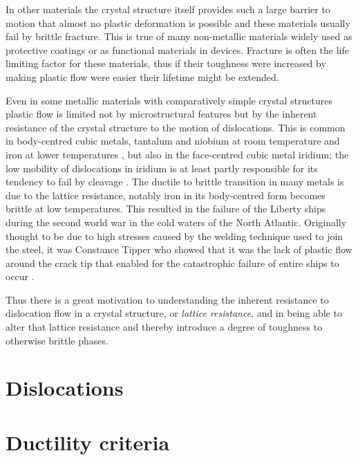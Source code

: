 In other materials the crystal structure itself provides such a large barrier to motion that almost no plastic deformation is possible and these materials usually fail by brittle fracture. This is true of many non-metallic materials widely used as protective coatings or as functional materials in devices. Fracture is often the life limiting factor for these materials, thus if their toughness were increased by making plastic flow were easier their lifetime might be extended. 

Even in some metallic materials with comparatively simple crystal structures plastic flow is limited not by microstructural features but by the inherent resistance of the crystal structure to the motion of dislocations. This is common in body-centred cubic metals, tantalum and niobium at room temperature and iron at lower temperatures \cite{Christian1983,Weinberger2013}, but also in the face-centred cubic metal iridium; the low mobility of dislocations in iridium is at least partly responsible for its tendency to fail by cleavage \cite{Panfilov2001}. The ductile to brittle transition in many metals is due to the lattice resistance, notably iron in its body-centred form becomes brittle at low temperatures. This resulted in the failure of the Liberty ships during the second world war in the cold waters of the North Atlantic. Originally thought to be due to high stresses caused by the welding technique used to join the steel, it was Constance Tipper who showed that it was the lack of plastic flow around the crack tip that enabled for the catastrophic failure of entire ships to occur \cite{Cottrell1997}. 

Thus there is a great motivation to understanding the inherent resistance to dislocation flow in a crystal structure, or \emph{lattice resistance}, and in being able to alter that lattice resistance and thereby introduce a degree of toughness to otherwise brittle phases.



\section{Dislocations}  
\label{sec:dislocations}



\section{Ductility criteria}
\label{sec:ductility_criteria}





